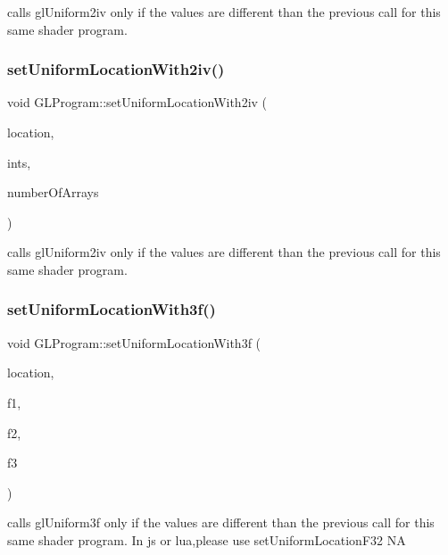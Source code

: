 calls gl\+Uniform2iv only if the values are different than the previous call for this same shader program. \mbox{\label{classGLProgram_ae367303d8a685968a2c94ddc26ca2136}} 
\subsubsection{\texorpdfstring{set\+Uniform\+Location\+With2iv()}{setUniformLocationWith2iv()}\hspace{0.1cm}{\footnotesize\ttfamily [2/2]}}
{\footnotesize\ttfamily void G\+L\+Program\+::set\+Uniform\+Location\+With2iv (\begin{DoxyParamCaption}\item[{G\+Lint}]{location,  }\item[{G\+Lint $\ast$}]{ints,  }\item[{unsigned int}]{number\+Of\+Arrays }\end{DoxyParamCaption})}

calls gl\+Uniform2iv only if the values are different than the previous call for this same shader program. \mbox{\label{classGLProgram_a33e41cd80fb48e0a57b471f35169783a}} 
\subsubsection{\texorpdfstring{set\+Uniform\+Location\+With3f()}{setUniformLocationWith3f()}\hspace{0.1cm}{\footnotesize\ttfamily [1/2]}}
{\footnotesize\ttfamily void G\+L\+Program\+::set\+Uniform\+Location\+With3f (\begin{DoxyParamCaption}\item[{G\+Lint}]{location,  }\item[{G\+Lfloat}]{f1,  }\item[{G\+Lfloat}]{f2,  }\item[{G\+Lfloat}]{f3 }\end{DoxyParamCaption})}

calls gl\+Uniform3f only if the values are different than the previous call for this same shader program. In js or lua,please use set\+Uniform\+Location\+F32  NA \mbox{\label{classGLProgram_a33e41cd80fb48e0a57b471f35169783a}} 
